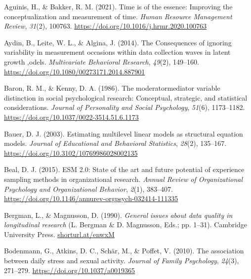 \documentclass[
  english,
  man,floatsintext]{apa7}
\newlength{\cslhangindent}
\newlength{\cslentryspacingunit} %
\newenvironment{CSLReferences}[2] %
 {%
  \setlength{\parindent}{0pt}
  \ifodd #1
  \let\oldpar\par
  \def\par{\hangindent=\cslhangindent\oldpar}
  \fi
  \setlength{\parskip}{#2\cslentryspacingunit}
 }%
 {}
\begin{document}
\newpage
\vspace*{-\topskip}
\vspace*{\fill}
\nointerlineskip

\hypertarget{refs}{}
\begin{CSLReferences}{1}{0}
\leavevmode{}%
Aguinis, H., \& Bakker, R. M. (2021). Time is of the essence: Improving the conceptualization and measurement of time. \emph{Human Resource Management Review}, \emph{31}(2), 100763. \url{https://doi.org/10.1016/j.hrmr.2020.100763}

\leavevmode{}%
Aydin, B., Leite, W. L., \& Algina, J. (2014). The Consequences of ignoring variability in measurement occasions within data collection waves in latent growth ,odels. \emph{Multivariate Behavioral Research}, \emph{49}(2), 149--160. \url{https://doi.org/10.1080/00273171.2014.887901}

\leavevmode{}%
Baron, R. M., \& Kenny, D. A. (1986). The moderator{\textendash}mediator variable distinction in social psychological research: Conceptual, strategic, and statistical considerations. \emph{Journal of Personality and Social Psychology}, \emph{51}(6), 1173--1182. \url{https://doi.org/10.1037/0022-3514.51.6.1173}

\leavevmode{}%
Bauer, D. J. (2003). Estimating multilevel linear models as structural equation models. \emph{Journal of Educational and Behavioral Statistics}, \emph{28}(2), 135--167. \url{https://doi.org/10.3102/10769986028002135}

\leavevmode{}%
Beal, D. J. (2015). ESM 2.0: State of the art and future potential of experience sampling methods in organizational research. \emph{Annual Review of Organizational Psychology and Organizational Behavior}, \emph{2}(1), 383--407. \url{https://doi.org/10.1146/annurev-orgpsych-032414-111335}

\leavevmode{}%
Bergman, L., \& Magnusson, D. (1990). \emph{General issues about data quality in longitudinal research} (L. Bergman \& D. Magnusson, Eds.; pp. 1--31). Cambridge University Press. \href{https://shorturl.at/enwxM}{shorturl.at/enwxM}

\leavevmode{}%
Bodenmann, G., Atkins, D. C., Schär, M., \& Poffet, V. (2010). The association between daily stress and sexual activity. \emph{Journal of Family Psychology}, \emph{24}(3), 271--279. \url{https://doi.org/10.1037/a0019365}


\end{CSLReferences}
\end{document}
